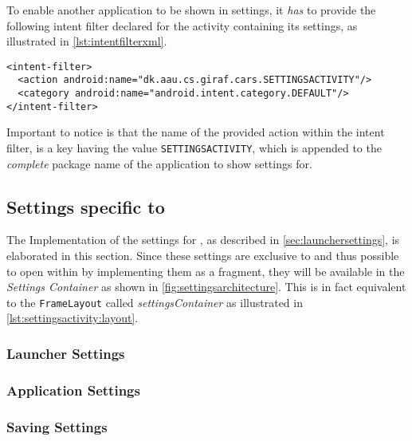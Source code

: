 To enable another \giraf application to be shown in settings, it \textit{has} to provide the following intent filter declared for the activity containing its settings, as illustrated in \cref{lst:intentfilterxml}.

\begin{lstlisting}[caption={The intent filter and action a \giraf application has to provide to be shown in settings.}, label={lst:intentfilterxml}]
<intent-filter>
  <action android:name="dk.aau.cs.giraf.cars.SETTINGSACTIVITY"/>
  <category android:name="android.intent.category.DEFAULT"/>
</intent-filter>
\end{lstlisting}

Important to notice is that the name of the provided action within the intent filter, is a key having the value \lstinline|SETTINGSACTIVITY|, which is appended to the \textit{complete} package name of the application to show settings for.

\subsection{Settings specific to \launcher}
The Implementation of the settings for \launcher, as described in \cref{sec:launchersettings}, is elaborated in this section.
Since these settings are exclusive to \launcher and thus possible to open within \settingsactivity by implementing them as a fragment, they will be available in the \textit{Settings Container} as shown in \cref{fig:settingsarchitecture}.
This is in fact equivalent to the \lstinline|FrameLayout| called \textit{settingsContainer} as illustrated in \cref{lst:settingsactivity:layout}.


\subsubsection{Launcher Settings}


\subsubsection{Application Settings}


\subsubsection{Saving Settings}\label{para:sprint4:managingsettingsandroid}

